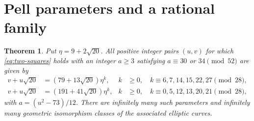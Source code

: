 \documentclass[11pt,leqno,oneside,letterpaper]{amsart}
\newtheorem{theorem}{Theorem}[section]
\theoremstyle{remark}
\numberwithin{equation}{section}
\begin{document}
\section{Pell parameters and a rational family}

\begin{samepage}
  \begin{theorem}\label{thm:pell}
    Put $\eta=9+2\sqrt{20}$. All positive integer pairs $(u,v)$ for which \eqref{eq:two-squares} holds with an integer $a\geq3$ satisfying $a\equiv30$ or $34\pmod{52}$ are given by
    \begin{align*}
      v+u\sqrt{20} & =(79+13\sqrt{20})\eta^k,
                   & k                         & \geq0,\quad k\equiv6,7,14,15,22,27\pmod{28}, \\
      v+u\sqrt{20} & =(191+41\sqrt{20})\eta^k,
                   & k                         & \geq0,\quad k\equiv0,5,12,13,20,21\pmod{28},
    \end{align*}
    with $a=(u^2-73)/12$. There are infinitely many such parameters and infinitely many geometric isomorphism classes of the associated elliptic curves.
  \end{theorem}
\end{samepage}
\end{document}
